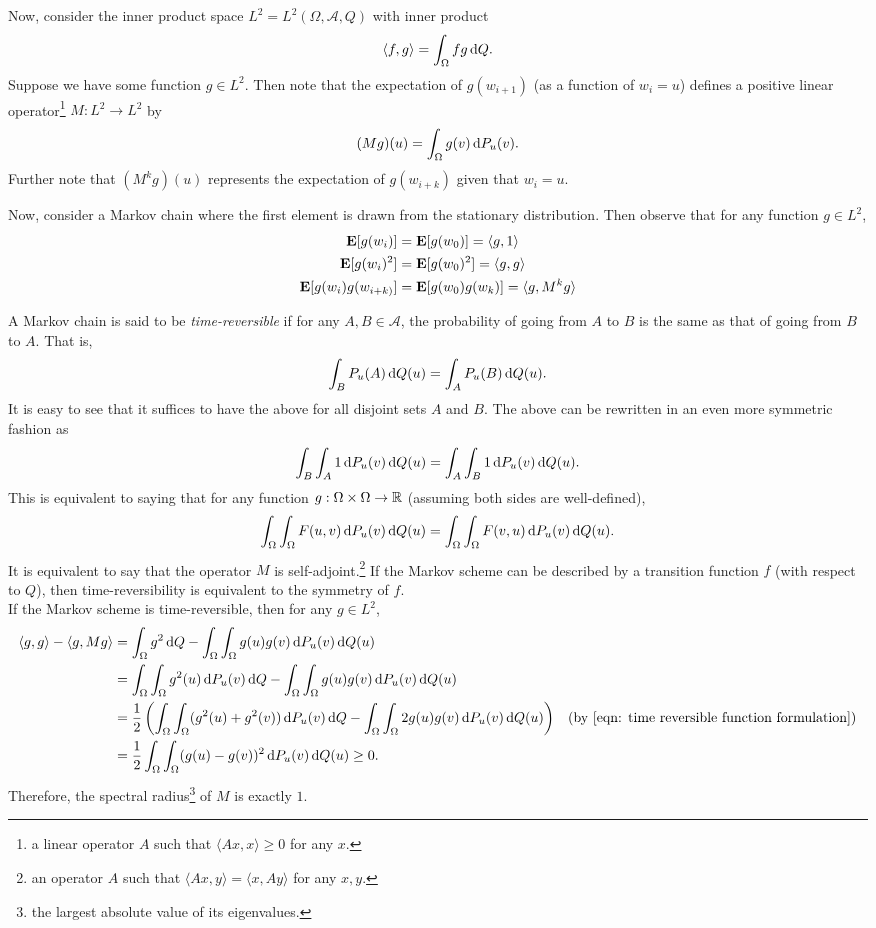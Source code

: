 Now, consider the inner product space $L^2 = L^2 (\Omega,\mathcal{A},Q)$ with inner product
\[ \langle f,g\rangle = \int_\Omega f g\operatorname{d}\!{Q}. \]
Suppose we have some function $g\in L^2$. Then note that the expectation of $g(w_{i+1})$ (as a function of $w_i = u$) defines a positive linear operator\footnote{a linear operator $A$ such that $\langle Ax,x\rangle\geq 0$ for any $x$.} $M:L^2\to L^2$ by
\[ (Mg)(u) = \int_\Omega g(v)\operatorname{d}\!{P_u}(v). \]
Further note that $(M^k g)(u)$ represents the expectation of $g(w_{i+k})$ given that $w_i=u$.

Now, consider a Markov chain where the first element is drawn from the stationary distribution. Then observe that for any function $g\in L^2$,
\begin{align*}
    \textbf{E}[g(w_i)] &= \textbf{E}[g(w_0)] = \langle g,1\rangle \\
    \textbf{E}[g(w_i)^2] &= \textbf{E}[g(w_0)^2] = \langle g,g\rangle \\
    \textbf{E}[g(w_i)g(w_{i+k)}] &= \textbf{E}[g(w_0)g(w_k)] = \langle g,M^k g\rangle
\end{align*}

A Markov chain is said to be \textit{time-reversible} if for any $A,B\in\mathcal{A}$, the probability of going from $A$ to $B$ is the same as that of going from $B$ to $A$. That is,
\[ \int_B P_u(A)\operatorname{d}\!{Q}(u) = \int_A P_u(B) \operatorname{d}\!{Q}(u). \]
It is easy to see that it suffices to have the above for all disjoint sets $A$ and $B$. The above can be rewritten in an even more symmetric fashion as
\[ \int_B \int_A 1\operatorname{d}\!{P}_u(v)\operatorname{d}\!{Q}(u) = \int_A \int_B 1\operatorname{d}\!{P}_u(v)\operatorname{d}\!{Q}(u). \]
This is equivalent to saying that for any function $g:\Omega\times\Omega\to\mathbb{R}$ (assuming both sides are well-defined),
\begin{equation}
\label{eqn: time reversible function formulation}
    \int_\Omega \int_\Omega F(u,v)\operatorname{d}\!{P}_u(v)\operatorname{d}\!{Q}(u) = \int_\Omega \int_\Omega F(v,u)\operatorname{d}\!{P}_u(v)\operatorname{d}\!{Q}(u).
\end{equation}
It is equivalent to say that the operator $M$ is self-adjoint.\footnote{an operator $A$ such that $\langle Ax,y\rangle=\langle x,A y\rangle$ for any $x,y$.} If the Markov scheme can be described by a transition function $f$ (with respect to $Q$), then time-reversibility is equivalent to the symmetry of $f$.\\
If the Markov scheme is time-reversible, then for any $g\in L^2$,
\begin{align}
    \langle g,g\rangle - \langle g,M g\rangle &= \int_{\Omega} g^2\d{Q} - \int_\Omega\int_\Omega g(u)g(v)\d{P_u}(v)\d{Q}(u) \nonumber \\
    &= \int_{\Omega}\int_\Omega g^2(u)\d{P_u}(v)\d{Q} - \int_\Omega\int_\Omega g(u)g(v)\d{P_u}(v)\d{Q}(u) \nonumber \\
    &= \frac{1}{2} \left(\int_{\Omega}\int_\Omega (g^2(u)+g^2(v))\d{P_u}(v)\d{Q} - \int_\Omega\int_\Omega 2g(u)g(v)\d{P_u}(v)\d{Q}(u)\right) & (\text{by \Cref{eqn: time reversible function formulation}}) \nonumber \\
    &= \frac{1}{2}\int_\Omega\int_\Omega (g(u)-g(v))^2\d{P_u}(v)\d{Q}(u) \geq 0. \label{eqn: self-adjoint spectral radius 1}
\end{align}
Therefore, the spectral radius\footnote{the largest absolute value of its eigenvalues.} of $M$ is exactly $1$.


